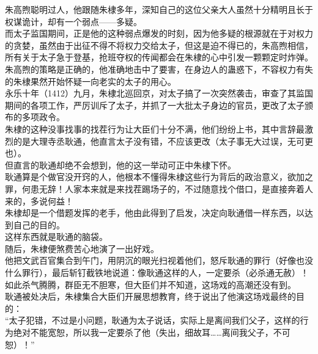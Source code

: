 \begin{multicols}{\theparacolNo}
朱高煦聪明过人，他跟随朱棣多年，深知自己的这位父亲大人虽然十分精明且长于权谋诡计，却有一个弱点——多疑。\\

而太子监国期间，正是他的这种弱点爆发的时刻，因为他多疑的根源就在于对权力的贪婪，虽然由于出征不得不将权力交给太子，但这是迫不得已的，朱高煦相信，所有关于太子急于登基，抢班夺权的传闻都会在朱棣的心中引发一颗颗定时炸弹。\\

朱高煦的策略是正确的，他准确地击中了要害，在身边人的蛊惑下，不容权力有失的朱棣果然开始怀疑一向老实的太子的用心。\\

永乐十年（1412）九月，朱棣北巡回京，对太子搞了一次突然袭击，审查了其监国期间的各项工作，严厉训斥了太子，并抓了一大批太子身边的官员，更改了太子颁布的多项政令。\\

朱棣的这种没事找事的找茬行为让大臣们十分不满，他们纷纷上书，其中言辞最激烈的是大理寺丞耿通，他直言太子没有错，不应该更改（太子事无大过误，无可更也）。\\

但直言的耿通却绝不会想到，他的这一举动可正中朱棣下怀。\\

耿通算是个做官没开窍的人，他根本不懂得朱棣这些行为背后的政治意义，欲加之罪，何患无辞！人家本来就是来找茬踢场子的，不过随意找个借口，是直接奔着人来的，多说何益！\\

朱棣却是一个借题发挥的老手，他由此得到了启发，决定向耿通借一样东西，以达到自己的目的。\\

这样东西就是耿通的脑袋。\\

随后，朱棣便煞费苦心地演了一出好戏。\\

他把文武百官集合到午门，用阴沉的眼光扫视着他们，怒斥耿通的罪行（好像也没什么罪行），最后斩钉截铁地说道：像耿通这样的人，一定要杀（必杀通无赦）！\\

如此杀气腾腾，群臣无不胆寒，但大臣们并不知道，这场戏的高潮还没有到。\\

耿通被处决后，朱棣集合大臣们开展思想教育，终于说出了他演这场戏最终的目的：\\

“太子犯错，不过是小问题，耿通为太子说话，实际上是离间我们父子，这样的行为绝对不能宽恕，所以我一定要杀了他（失出，细故耳……离间我父子，不可恕）！”\\


\end{multicols}

